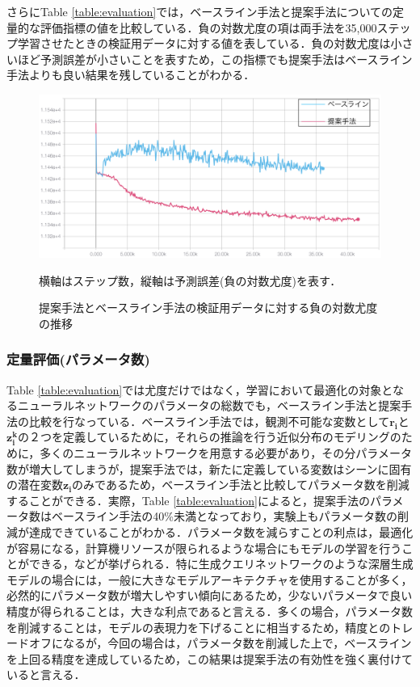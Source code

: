 さらにTable \ref{table:evaluation}では，ベースライン手法と提案手法についての定量的な評価指標の値を比較している．負の対数尤度の項は両手法を35,000ステップ学習させたときの検証用データに対する値を表している．負の対数尤度は小さいほど予測誤差が小さいことを表すため，この指標でも提案手法はベースライン手法よりも良い結果を残していることがわかる．

\begin{figure}[tbp]
  \begin{center}
    \includegraphics[width=\linewidth]{./figures/test_loss.png}
    \caption{提案手法とベースライン手法の検証用データに対する負の対数尤度の推移}
    横軸はステップ数，縦軸は予測誤差(負の対数尤度)を表す．
    \label{fig:test_loss}
  \end{center}
\end{figure}

\subsubsection{定量評価(パラメータ数)}
Table \ref{table:evaluation}では尤度だけではなく，学習において最適化の対象となるニューラルネットワークのパラメータの総数でも，ベースライン手法と提案手法の比較を行なっている．ベースライン手法では，観測不可能な変数として$\bm{r_i}$と$\bm{z_i^k}$の２つを定義しているために，それらの推論を行う近似分布のモデリングのために，多くのニューラルネットワークを用意する必要があり，その分パラメータ数が増大してしまうが，提案手法では，新たに定義している変数はシーンに固有の潜在変数$\bm{z_i}$のみであるため，ベースライン手法と比較してパラメータ数を削減することができる．実際，Table \ref{table:evaluation}によると，提案手法のパラメータ数はベースライン手法の40\%未満となっており，実験上もパラメータ数の削減が達成できていることがわかる．パラメータ数を減らすことの利点は，最適化が容易になる，計算機リソースが限られるような場合にもモデルの学習を行うことができる，などが挙げられる．特に生成クエリネットワークのような深層生成モデルの場合には，一般に大きなモデルアーキテクチャを使用することが多く，必然的にパラメータ数が増大しやすい傾向にあるため，少ないパラメータで良い精度が得られることは，大きな利点であると言える．多くの場合，パラメータ数を削減することは，モデルの表現力を下げることに相当するため，精度とのトレードオフになるが，今回の場合は，パラメータ数を削減した上で，ベースラインを上回る精度を達成しているため，この結果は提案手法の有効性を強く裏付けていると言える．

